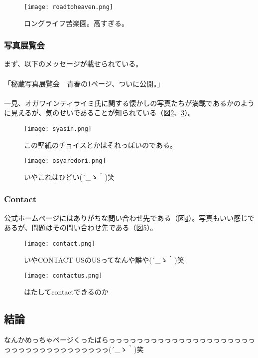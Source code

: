 \begin{figure}[H]
  \centering
  \texttt{[image: roadtoheaven.png]}
  \caption{ロングライフ苦楽園。高すぎる。}
\label{roadtoheaven}
\end{figure}

\subsubsection{写真展覧会}
まず、以下のメッセージが載せられている。\\
 \\
「秘蔵写真展覧会　青春の1ページ、ついに公開。」\\
 \\
一見、オガワインティライミ氏に関する懐かしの写真たちが満載であるかのように見えるが、気のせいであることが知られている（図\ref{syasin}、\ref{osyaredori}）。\\

\begin{figure}[H]
  \centering
  \texttt{[image: syasin.png]}
  \caption{この壁紙のチョイスとかはそれっぽいのである。}
\label{syasin}
\end{figure}

\begin{figure}[H]
  \centering
  \texttt{[image: osyaredori.png]}
  \caption{いやこれはひどい\sf (´\_ゝ｀)笑}
\label{osyaredori}
\end{figure}

\subsubsection{Contact}
公式ホームページにはありがちな問い合わせ先である（図\ref{contact}）。写真もいい感じであるが、問題はその問い合わせ先である（図\ref{contactus}）。

\begin{figure}[H]
  \centering
  \texttt{[image: contact.png]}
  \caption{いやCONTACT USのUSってなんや誰や\sf (´\_ゝ｀)笑}
\label{contact}
\end{figure}

\begin{figure}[H]
  \centering
  \texttt{[image: contactus.png]}
  \caption{はたしてcontactできるのか}
\label{contactus}
\end{figure}


\subsection{結論}
なんかめっちゃページくったばらっっっっっっっっっっっっっっっっっっっっっっっっっっっっっっっっっっっっ\sf (´\_ゝ｀)笑
